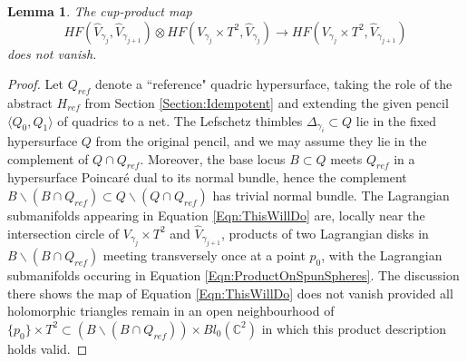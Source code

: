 \documentclass[reqno,10pt]{amsart}
\numberwithin{equation}{section}
\newcommand{\bC}{{\mathbb C}}
\newtheorem{Lemma}[thm]{Lemma}
\theoremstyle{remark}
\begin{document}
 \begin{Lemma} \label{Lem:TriangleCount}
 The cup-product map
\begin{equation} \label{Eqn:ThisWillDo}
HF(\hat{V}_{\gamma_{j}}, \hat{V}_{\gamma_{j+1}}) \otimes HF(V_{\gamma_j} \times T^2, \hat{V}_{\gamma_{j}}) \longrightarrow HF(V_{\gamma_j} \times T^2, \hat{V}_{\gamma_{j+1}})
\end{equation}
does not vanish.
 \end{Lemma}
 
 \begin{proof}
  Let  $Q_{ref}$ denote a ``reference" quadric hypersurface, taking the role of the abstract $H_{ref}$ from Section \ref{Section:Idempotent} and extending the given pencil $\langle Q_0, Q_1\rangle$ of quadrics to a net. The Lefschetz thimbles $\Delta_{\gamma_i} \subset Q$ lie in the fixed hypersurface $Q$ from the original pencil, and we may assume they lie in the complement of $Q\cap Q_{ref}$.  Moreover, the base locus $B \subset Q$ meets $Q_{ref}$ in a hypersurface Poincar\'e dual to its normal bundle, hence the complement $B\backslash (B \cap Q_{ref}) \subset Q\backslash (Q\cap Q_{ref})$ has trivial normal bundle.  The Lagrangian submanifolds appearing in Equation \ref{Eqn:ThisWillDo} are, locally near the intersection circle of $V_{\gamma_j} \times T^2$ and $\hat{V}_{\gamma_{j+1}}$, products of two Lagrangian disks in $B\backslash (B \cap Q_{ref})$ meeting transversely once at a point $p_0$, with the Lagrangian submanifolds occuring in Equation \ref{Eqn:ProductOnSpunSpheres}.  The discussion there shows the map of Equation \ref{Eqn:ThisWillDo} does not vanish provided all holomorphic triangles remain in an open neighbourhood of  $\{p_0\}\times T^2 \subset (B\backslash (B \cap Q_{ref})) \times Bl_0(\bC^2)$ in which this product description holds valid.  


\end{proof}
\end{document}
